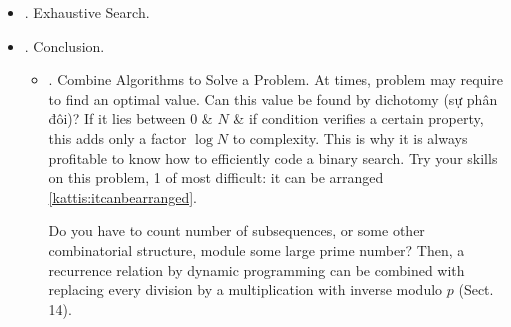 \documentclass{article}
\newtheorem{problem}{Problem}
\begin{document}
\begin{itemize}
\begin{itemize}
		\begin{problem}[Spiral of primes \href{https://icpcarchive.ecs.baylor.edu/index.php?option=com_onlinejudge&Itemid=8&category=79&page=show_problem&problem=121}{[icpcarchive:2120]}]
			
		\end{problem}
		
		\begin{problem}[Prime or not \href{https://www.spoj.com/problems/PON/}{[spoj:PON]}]
			
		\end{problem}
		
		\begin{problem}[Bazinga! \href{https://www.spoj.com/problems/DCEPC505/}{[spoj:DCEPC505]}]
			
		\end{problem}
		
		\item {. Evaluate an Arithmetic Expression.} Def: Given an expression obeying a certain fixed syntax, construct syntax (parse) tree or evaluate value of expression, see {\sf Fig. 14.1: Syntax tree associated with expression $2 + (3\times 4)/2$.}
		
		{\it Approaches.} p. 218
		\item {. System of Linear Equations.}
		\item {: Multiplication of a Matrix Sequence.}
	\end{itemize}	
	\item {. Exhaustive Search.}
	\item {. Conclusion.}
	\begin{itemize}
		\item {. Combine Algorithms to Solve a Problem.} At times, problem may require to find an optimal value. Can this value be found by dichotomy (sự phân đôi)?  If it lies between 0 \& $N$ \& if condition verifies a certain property, this adds only a factor $\log N$ to complexity. This is why it is always profitable to know how to efficiently code a binary search. Try your skills on this problem, 1 of most difficult: it can be arranged \href{https://open.kattis.com/problems/itcanbearranged}{[kattis:itcanbearranged]}.
		
		Do you have to count number of subsequences, or some other combinatorial structure, module some large prime number? Then, a recurrence relation by dynamic programming can be combined with replacing every division by a multiplication with inverse modulo $p$ (Sect. 14).
		

\end{itemize}
\end{itemize}
\end{document}
